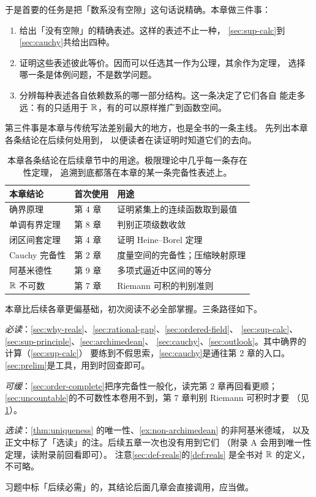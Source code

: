 于是首要的任务是把「数系没有空隙」这句话说精确。本章做三件事：

\begin{enumerate}[label=(\arabic*)]
  \item 给出「没有空隙」的精确表述。这样的表述不止一种，
        \cref{sec:sup-calc}到 \cref{sec:cauchy}共给出四种。
  \item 证明这些表述彼此等价。因而可以任选其一作为公理，其余作为定理，
        选择哪一条是体例问题，不是数学问题。
  \item 分辨每种表述各自依赖数系的哪一部分结构。这一条决定了它们各自
        能走多远：有的只适用于 \(\mathbb{R}\)，有的可以原样推广到函数空间。
\end{enumerate}

第三件事是本章与传统写法差别最大的地方，也是全书的一条主线。
 先列出本章各条结论在后续何处用到，
以便读者在读证明时知道它们的去向。

\begin{table}[htbp]
  \centering
  \caption{本章各条结论在后续章节中的用途。极限理论中几乎每一条存在性定理，
    追溯到底都落在本章的某一条完备性表述上。}
  \label{tab:where-used}
  \begin{tabular}{@{}lll@{}}
    \toprule
    本章结论 & 首次使用 & 用途 \\
    \midrule
    确界原理     & 第 4 章 & 证明紧集上的连续函数取到最值 \\
    单调有界定理 & 第 8 章 & 判别正项级数收敛 \\
    闭区间套定理 & 第 4 章 & 证明 Heine--Borel 定理 \\
    Cauchy 完备性 & 第 2 章 & 度量空间的完备性；压缩映射原理 \\
    阿基米德性   & 第 9 章 & 多项式逼近中区间的等分 \\
    \(\mathbb{R}\) 不可数 & 第 7 章 & Riemann 可积的判别准则 \\
    \bottomrule
  \end{tabular}
\end{table}

\begin{remark}[读法建议]
  本章比后续各章更偏基础，初次阅读不必全部掌握。三条路径如下。

  \emph{必读}：\cref{sec:why-reals}、\cref{sec:rational-gap}、\cref{sec:ordered-field}、
  \cref{sec:sup-calc}、\cref{sec:sup-principle}、\cref{sec:archimedean}、
  \cref{sec:cauchy}、\cref{sec:outlook}。其中确界的计算（\cref{sec:sup-calc}）
  要练到不假思索，\cref{sec:cauchy}是通往第 2 章的入口。
  \cref{sec:prelim}是工具，用到时回查即可。

  \emph{可缓}：\cref{sec:order-complete}把序完备性一般化，读完第 2 章再回看更顺；
  \cref{sec:uncountable}的不可数性本卷用不到，第 7 章判别 Riemann 可积时才要
  （见\cref{tab:where-used}）。

  \emph{选读}：\cref{thm:uniqueness} 的唯一性、\cref{ex:non-archimedean} 的非阿基米德域，
  以及正文中标了「选读」的注。后续五章一次也没有用到它们
  （附录 A 会用到唯一性定理，读附录前回看即可）。
  注意\cref{sec:def-reals}的\cref{def:reals} 是全书对 \(\mathbb{R}\) 的定义，不可略。

  习题中标「后续必需」的，其结论后面几章会直接调用，应当做。
\end{remark}

